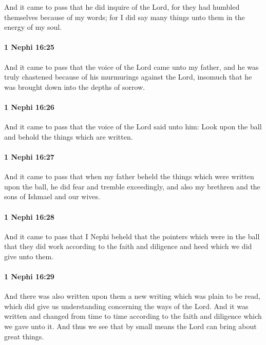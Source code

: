 			And it came to pass that he did inquire of the Lord,
			for they had humbled themselves because of my words;
			for I did say many things unto them in the energy of my soul.

		\paragraph{1 Nephi 16:25} %
			\label{1NEPHI-16-25}

			And it came to pass that the voice of the Lord came unto my father,
			and he was truly chastened because of his murmurings against the Lord,
			insomuch that he was brought down into the depths of sorrow.

		\paragraph{1 Nephi 16:26} %
			\label{1NEPHI-16-26}

			And it came to pass that the voice of the Lord said unto him:
			Look upon the ball and behold the things which are written.

		\paragraph{1 Nephi 16:27} %
			\label{1NEPHI-16-27}

			And it came to pass that when my father beheld the things
			which were written upon the ball,
			he did fear and tremble exceedingly,
			and also my brethren and the sons of Ishmael and our wives.

		\paragraph{1 Nephi 16:28} %
			\label{1NEPHI-16-28}

			And it came to pass that I Nephi beheld that the pointers which were in the ball
			that they did work according to the faith and diligence and heed
			which we did give unto them.

		\paragraph{1 Nephi 16:29} %
			\label{1NEPHI-16-29}

			And there was also written upon them a new writing which was plain to be read,
			which did give us understanding concerning the ways of the Lord.
			And it was written and changed from time to time
			according to the faith and diligence which we gave unto it.
			And thus we see that by small means the Lord can bring about great things.

